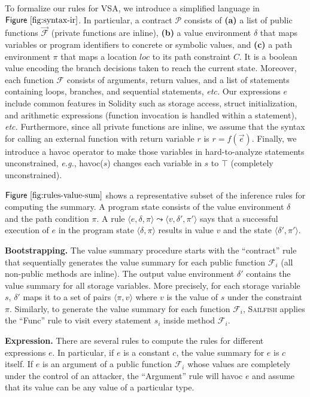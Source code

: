 \documentclass[conference, romanappendices]{tex/IEEEtran}
\theoremstyle{bfnote}
\newcommand{\toolname}{\textsc{Sailfish}\xspace}
\newcommand{\solidity}{{\sc Solidity}\xspace}
\newcommand{\etc}{\textit{etc.}}
\newcommand{\eg}{\textit{e.g.}}
\newcommand{\Fig}[1]{\ensuremath{\sf Figure~\ref{#1}}}
\newcommand{\contract}{\mathcal{P}}
\newcommand{\valEnv}{\delta}
\newcommand{\pathEnv}{\pi}
\newcommand{\func}{\mathcal{F}}
\begin{document}
To formalize our rules for VSA, we introduce a simplified language in \Fig{fig:syntax-ir}.
In particular, a contract $\contract$ consists of 
\textbf{(a)} a list of public functions $\vec{\func}$ (private functions are inline), 
\textbf{(b)} a value environment $\valEnv$ that maps variables or program identifiers to concrete or symbolic values, and 
\textbf{(c)} a path environment $\pathEnv$ that maps a location $loc$ to its path constraint $C$.
It is a boolean value encoding the branch decisions taken to reach the current state.
Moreover, each function $\func$ consists of arguments, return values, and a list of statements containing loops, branches, and sequential statements, \etc{}
Our expressions $e$ include common features in \solidity{} such as storage access, struct initialization, 
and arithmetic expressions (function invocation is handled within a statement), \etc{}
Furthermore, since all private functions are inline, we assume that the syntax for calling an external function with return variable $r$ is $r = f(\vec{e})$.
Finally, we introduce a \textsf{havoc} operator to make those variables in hard-to-analyze statements unconstrained, \eg, \textsf{havoc}($s$) changes each variable in $s$ to $\top$ (completely unconstrained). 

\Fig{fig:rules-value-sum} shows a representative subset of the inference rules for computing the summary.
A program state consists of the value environment $\valEnv$ and the path condition $\pathEnv$.
A rule $\langle e, \valEnv,\pathEnv \rangle {\leadsto} \langle v, \valEnv', \pathEnv' \rangle$ says that a successful execution of $e$ in the program state $\langle \valEnv,\pathEnv \rangle$ results in value $v$ and the state $\langle \valEnv',\pathEnv' \rangle$.


\noindent
\textbf{Bootstrapping.}
The value summary procedure starts with the ``contract'' rule that sequentially generates the value summary for each public function $\func_i$ (all non-public methods are inline).
The output value environment $\valEnv'$ contains the value summary for all storage variables.
More precisely, for each storage variable $s$, $\valEnv'$ maps it to a set of pairs $\langle \pathEnv, v \rangle$ where $v$ is the value of $s$ under the constraint $\pathEnv$.
Similarly, to generate the value summary for each function $\func_i$, \toolname applies the ``Func'' rule to visit every statement $s_i$ inside method $\func_i$. 

\noindent
\textbf{Expression.}
There are several rules to compute the rules for different expressions $e$. In particular, if $e$ is a constant $c$, the value summary for $e$ is $c$ itself. 
If $e$ is an argument of a public function $\func_i$ whose values are completely under the control of an attacker, the ``Argument'' rule will havoc $e$ and assume that its value can be any value of a particular type. 
\end{document}
